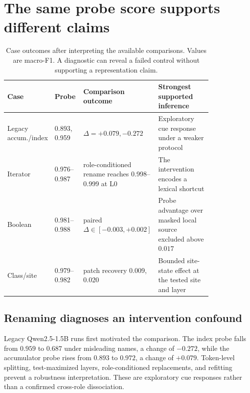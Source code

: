 \documentclass{article}
\begin{document}
\section{The same probe score supports different claims}

\begin{table}[t]
\centering
\small
\setlength{\tabcolsep}{3.5pt}
\caption{Case outcomes after interpreting the available comparisons. Values
are macro-F1. A diagnostic can reveal a failed control without supporting a
representation claim.}
\label{tab:evidence}
\begin{tabular}{L{0.13\linewidth}L{0.15\linewidth}L{0.17\linewidth}L{0.38\linewidth}}
\toprule
Case & Probe & Comparison outcome & Strongest supported inference \\
\midrule
Legacy accum./index & 0.893, 0.959 & $\Delta=+0.079,-0.272$ &
Exploratory cue response under a weaker protocol \\
Iterator & 0.976--0.987 & role-conditioned rename reaches 0.998--0.999 at L0 &
The intervention encodes a lexical shortcut \\
Boolean & 0.981--0.988 & paired $\Delta \in [-0.003,+0.002]$ &
Probe advantage over masked local source excluded above $0.017$ \\
Class/site & 0.979--0.982 & patch recovery 0.009, 0.020 &
Bounded site-state effect at the tested site and layer \\
\bottomrule
\end{tabular}
\end{table}

\subsection{Renaming diagnoses an intervention confound}

Legacy Qwen2.5-1.5B runs first motivated the comparison. The index probe falls
from $0.959$ to $0.687$ under misleading names, a change of $-0.272$, while
the accumulator probe rises from $0.893$ to $0.972$, a change of $+0.079$.
Token-level splitting, test-maximized layers, role-conditioned replacements,
and refitting prevent a robustness interpretation. These are exploratory cue
responses rather than a confirmed cross-role dissociation.
\end{document}
